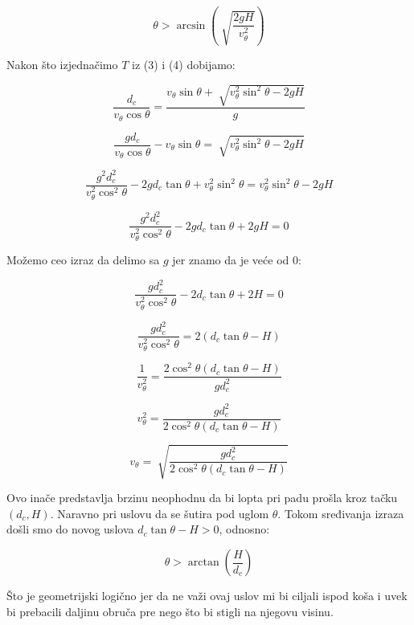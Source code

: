 \documentclass[a4paper, 12pt]{article}
\begin{document}
\begin{equation}
{\theta} > \arcsin(\sqrt[]{\dfrac{2 g H}{v_{\theta}^2}})
\end{equation}


Nakon što izjednačimo $T$ iz (3) i (4) dobijamo:

\[\dfrac{d_c}{v_\theta \cos \theta} = \dfrac{v_{\theta} \sin \theta + \sqrt[]{v_{\theta}^2 \sin^2 \theta - 2 g H}}{g}\]

\[\dfrac{g d_c}{v_\theta \cos \theta} - v_{\theta} \sin \theta = \sqrt[]{v_{\theta}^2 \sin^2 \theta - 2 g H}\]

\[\dfrac{g^2 d_c^2}{v_\theta^2 \cos^2 \theta} - 2 g d_c \tan \theta + v_{\theta}^2 \sin^2 \theta = v_{\theta}^2 \sin^2 \theta - 2 g H\]


\[\dfrac{g^2 d_c^2}{v_\theta^2 \cos^2 \theta} - 2 g d_c \tan \theta + 2 g H = 0\]

Možemo ceo izraz da delimo sa $g$ jer znamo da je veće od 0:

\begin{equation}
\dfrac{g d_c^2}{v_\theta^2 \cos^2 \theta} - 2 d_c \tan \theta + 2 H = 0
\end{equation}

\[\dfrac{g d_c^2}{v_\theta^2 \cos^2 \theta} = 2 (d_c \tan \theta - H)\]

\[\dfrac{1}{v_\theta^2} = \dfrac{2 \cos^2 \theta (d_c \tan \theta - H)}{g d_c^2}\]

\[v_\theta^2 = \dfrac{g d_c^2}{2 \cos^2 \theta (d_c \tan \theta - H)}\]


\begin{equation}
v_\theta = \sqrt[]{\dfrac{g d_c^2}{2 \cos^2 \theta (d_c \tan \theta - H)}}
\end{equation}


Ovo inače predstavlja brzinu neophodnu da bi lopta pri padu prošla kroz tačku $(d_c,H)$. Naravno pri uslovu da se šutira pod uglom $\theta$.
Tokom sređivanja izraza došli smo do novog uslova $d_c \tan \theta - H > 0$, odnosno:

\begin{equation}
\theta > \arctan(\dfrac{H}{d_c})
\end{equation}


Što je geometrijski logično jer da ne važi ovaj uslov mi bi ciljali ispod koša i uvek bi prebacili daljinu obruča pre nego što bi stigli na njegovu visinu.
\end{document}
